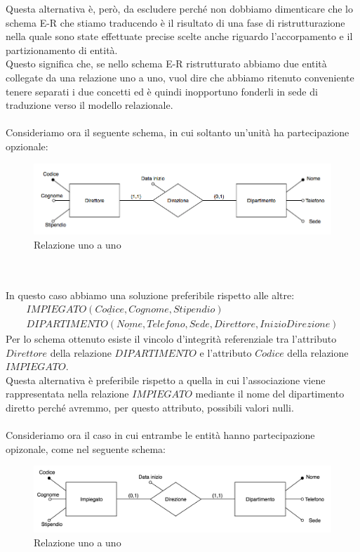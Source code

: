 Questa alternativa è, però, da escludere perché non dobbiamo dimenticare che lo schema E-R che stiamo traducendo è il risultato di una fase di ristrutturazione nella quale sono state effettuate precise scelte anche riguardo l'accorpamento e il partizionamento di entità.\\
Questo significa che, se nello schema E-R ristrutturato abbiamo due entità collegate da una relazione uno a uno, vuol dire che abbiamo ritenuto conveniente tenere separati i due concetti ed è quindi inopportuno fonderli in sede di traduzione verso il modello relazionale.\\\\
Consideriamo ora il seguente schema, in cui soltanto un'unità ha partecipazione opzionale:
    \begin{figure}[h!]
        \centering
        \includegraphics[scale = 0.5]{15/img10b}
        \caption{Relazione uno a uno}
    \end{figure}\\\\
In questo caso abbiamo una soluzione preferibile rispetto alle altre:
    \begin{equation}\begin{aligned}
        IMPIEGATO(\underline{Codice}, Cognome, Stipendio)\\
        DIPARTIMENTO(\underline{Nome}, Telefono, Sede, Direttore, InizioDirezione)
    \end{aligned}\end{equation}
Per lo schema ottenuto esiste il vincolo d'integrità referenziale tra l'attributo $Direttore$ della relazione $DIPARTIMENTO$ e l'attributo $Codice$ della relazione $IMPIEGATO$.\\
Questa alternativa è preferibile rispetto a quella in cui l'associazione viene rappresentata nella relazione $IMPIEGATO$ mediante il nome del dipartimento diretto perché avremmo, per questo attributo, possibili valori nulli.\\\\
Consideriamo ora il caso in cui entrambe le entità hanno partecipazione opizonale, come nel seguente schema:
    \begin{figure}[h!]
        \centering
        \includegraphics[scale = 0.5]{15/img11}
        \caption{Relazione uno a uno}
    \end{figure}\\\\
